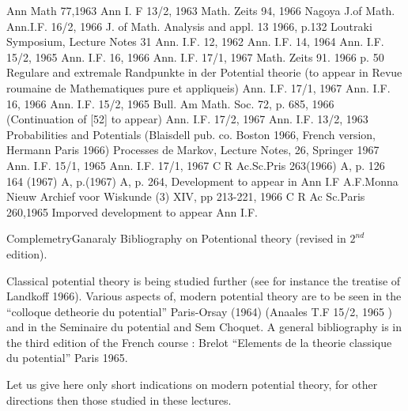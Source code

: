 \begin{thebibliography}{99}
 Ann Math 77,1963
 Ann I. F 13/2, 1963
 Math. Zeits 94, 1966
Nagoya J.of Math.
 Ann.I.F. 16/2, 1966\pageoriginale
{} J. of Math. Analysis and appl. 13 1966, p.132
 Loutraki Symposium, Lecture Notes 31
 Ann. I.F. 12, 1962
 Ann. I.F. 14, 1964
 Ann. I.F. 15/2, 1965
Ann. I.F. 16, 1966
 Ann. I.F. 17/1, 1967
 Math. Zeits 91. 1966 p. 50
 Regulare and extremale Randpunkte in
  der Potential theorie (to appear in Revue roumaine de Mathematiques
  pure et appliqueis)  
 Ann. I.F. 17/1, 1967
 Ann. I.F. 16, 1966
 Ann. I.F. 15/2, 1965
 Bull. Am Math. Soc. 72, p. 685, 1966
(Continuation of [52] to appear)
 Ann. I.F. 17/2, 1967
 Ann. I.F. 13/2, 1963
 Probabilities and Potentials (Blaisdell
  pub. co. Boston 1966, French version, Hermann Paris 1966) 
 Processes de Markov, Lecture Notes, 26, Springer 1967
 Ann. I.F. 15/1, 1965
 Ann. I.F. 17/1, 1967
 C R Ac.Sc.Pris 263(1966) A, p. 126 164
  (1967) A, p.(1967) A, p. 264, Development to appear in Ann I.F\pageoriginale 
{} {A.F.Monna} Nieuw Archief voor Wiskunde (3) XIV, pp
  213-221, 1966 
 C R Ac Sc.Paris 260,1965 Imporved
  development to appear Ann I.F. 
\end{thebibliography}

\newpage
Complemetry\pageoriginale Ganaraly Bibliography on Potentional theory (revised in
$2^{nd}$ edition). 

Classical potential theory is being studied further (see for instance
the  treatise of Landkoff 1966). Various aspects of, modern
potential theory are to be seen in the ``colloque detheorie du
potential'' Paris-Orsay (1964) (Anaales T.F 15/2, 1965 ) and in
the Seminaire du potential and Sem Choquet. A general bibliography is
in the third edition of the French course : Brelot ``Elements de la
theorie classique du potential'' Paris 1965. 

Let us give here only short indications on modern potential theory,
for other directions then those studied in these lectures. 

